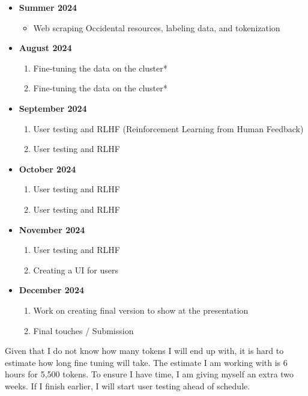 \documentclass[10pt,twocolumn]{article}
\begin{document}
\begin{itemize}
    \item \textbf{Summer 2024}
    \begin{itemize}
        \item Web scraping Occidental resources, labeling data, and tokenization
    \end{itemize}

    \item \textbf{August 2024}
    \begin{enumerate}
        \item Fine-tuning the data on the cluster*
        \item Fine-tuning the data on the cluster*
    \end{enumerate}

    \item \textbf{September 2024}
    \begin{enumerate}
        \item User testing and RLHF (Reinforcement Learning from Human Feedback)
        \item User testing and RLHF
    \end{enumerate}

    \item \textbf{October 2024}
    \begin{enumerate}
        \item User testing and RLHF
        \item User testing and RLHF
    \end{enumerate}

    \item \textbf{November 2024}
    \begin{enumerate}
        \item User testing and RLHF
        \item Creating a UI for users
    \end{enumerate}

    \item \textbf{December 2024}
    \begin{enumerate}
        \item Work on creating final version to show at the presentation
        \item Final touches / Submission
    \end{enumerate}
\end{itemize}

\noindent *Given that I do not know how many tokens I will end up with, it is hard to estimate how long fine tuning will take. The estimate I am working with is 6 hours for 5,500 tokens. To ensure I have time, I am giving myself an extra two weeks. If I finish earlier, I will start user testing ahead of schedule. \cite{noauthor_how_nodate}
\end{document}
